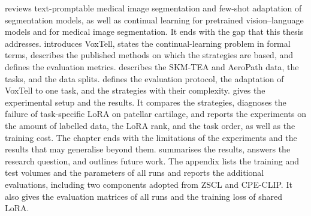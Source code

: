  reviews text-promptable medical image segmentation and few-shot adaptation of segmentation models, as well as continual learning for pretrained vision--language models and for medical image segmentation.
It ends with the gap that this thesis addresses.
 introduces VoxTell, states the continual-learning problem in formal terms, describes the published methods on which the strategies are based, and defines the evaluation metrics.
 describes the SKM-TEA and AeroPath data, the tasks, and the data splits.
 defines the evaluation protocol, the adaptation of VoxTell to one task, and the strategies with their complexity.
 gives the experimental setup and the results.
It compares the strategies, diagnoses the failure of task-specific LoRA on patellar cartilage, and reports the experiments on the amount of labelled data, the LoRA rank, and the task order, as well as the training cost.
The chapter ends with the limitations of the experiments and the results that may generalise beyond them.
 summarises the results, answers the research question, and outlines future work.
The appendix lists the training and test volumes and the parameters of all runs and reports the additional evaluations, including two components adopted from ZSCL and CPE-CLIP.
It also gives the evaluation matrices of all runs and the training loss of shared LoRA.
